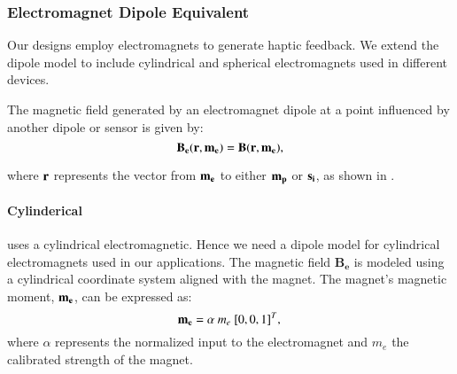 \subsubsection{Electromagnet Dipole Equivalent} 
\label{sc:back.dipole.cyl}
Our designs employ electromagnets to generate haptic feedback. We extend the dipole model to include cylindrical and spherical electromagnets used in different devices.

The magnetic field generated by an electromagnet dipole at a point influenced by another dipole or sensor is given by:
\begin{equation}
  \mathbf{B_e} (\mathbf{r},\mathbf{m_e}) =  \mathbf{B} (\mathbf{r}, \mathbf{m_e}),
  \label{eq:ap.B2}
\end{equation}

\noindent where $\mathbf{r}$ represents the vector from $\mathbf{m_e}$ to either $\mathbf{m_p}$ or $\mathbf{s_i}$, as shown in .

\paragraph{Cylinderical}
    \magpen uses a cylindrical electromagnetic. Hence we need a dipole model for cylindrical electromagnets used in our applications. The magnetic field $\mathbf{B_e}$ is modeled using a cylindrical coordinate system aligned with the magnet. The magnet's magnetic moment, $\mathbf{m_e}$, can be expressed as:
    \begin{equation}
        \mathbf{m_e} = \alpha \ m_e \ [0,0,1]^T,\\
    \end{equation}
    \noindent where $\alpha$ represents the normalized input to the electromagnet and $m_e$ the calibrated strength of the magnet. 
    
       

